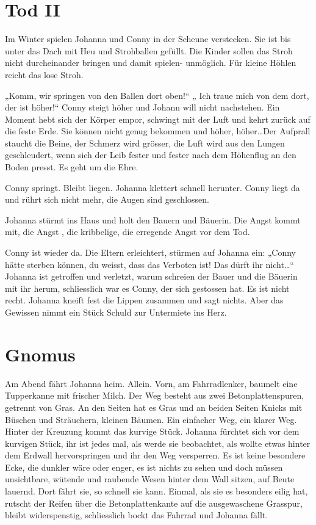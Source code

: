 \section*{Tod II}



Im Winter spielen Johanna und Conny in der Scheune verstecken. Sie ist bis unter das Dach mit Heu und Strohballen gefüllt. Die Kinder sollen das Stroh nicht durcheinander bringen und damit spielen- unmöglich. Für kleine Höhlen reicht das lose Stroh.

„Komm, wir springen von den Ballen dort oben!“ „ Ich traue mich von dem dort, der ist höher!“ Conny steigt höher und Johann will nicht nachstehen. Ein Moment hebt sich der Körper empor, schwingt mit der Luft und kehrt zurück auf die feste Erde. Sie können nicht genug bekommen und höher, höher\dots Der Aufprall staucht die Beine, der Schmerz wird grösser, die Luft wird aus den Lungen geschleudert, wenn sich der Leib fester und fester nach dem Höhenflug an den Boden presst. Es geht um die Ehre.

Conny springt. Bleibt liegen. Johanna klettert schnell herunter. Conny liegt da und rührt sich nicht mehr, die Augen sind geschlossen.

Johanna stürmt ins Haus und holt den Bauern und Bäuerin. Die Angst kommt mit, die Angst , die kribbelige, die erregende Angst vor dem Tod.

Conny ist wieder da. Die Eltern erleichtert, stürmen auf Johanna ein: „Conny hätte sterben können, du weisst, dass das Verboten ist! Das dürft ihr nicht\dots“ Johanna ist getroffen und verletzt, warum schreien der Bauer und die Bäuerin mit ihr herum, schliesslich war es Conny, der sich gestossen hat. Es ist nicht recht. Johanna kneift fest die Lippen zusammen und sagt nichts. Aber das Gewissen nimmt ein Stück Schuld zur Untermiete ins Herz.



\section*{Gnomus}



Am Abend fährt Johanna heim. Allein. Vorn, am Fahrradlenker, baumelt eine Tupperkanne mit frischer Milch. Der Weg besteht aus zwei Betonplattenspuren, getrennt von Gras. An den Seiten hat es Gras und an beiden Seiten Knicks mit Büschen und Sträuchern, kleinen Bäumen. Ein einfacher Weg, ein klarer Weg. Hinter der Kreuzung kommt das kurvige Stück. Johanna fürchtet sich vor dem kurvigen Stück, ihr ist jedes mal, als werde sie beobachtet, als wollte etwas hinter dem Erdwall hervorspringen und ihr den Weg versperren. Es ist keine besondere Ecke, die dunkler wäre oder enger, es ist nichts zu sehen und doch müssen unsichtbare, wütende und raubende Wesen hinter dem Wall sitzen, auf Beute lauernd. Dort fährt sie, so schnell sie kann. Einmal, als sie es besonders eilig hat, rutscht der Reifen über die Betonplattenkante auf die ausgewaschene Grasspur, bleibt widerspenstig, schliesslich bockt das Fahrrad und Johanna fällt.

